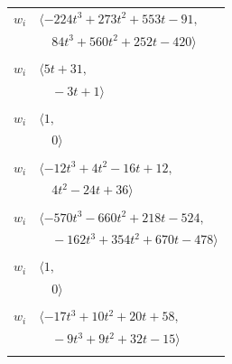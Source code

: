 \documentclass[11pt]{article}
\begin{document}
\begin{longtable}{@{}ll@{}}
$w_i$ & $\langle -224t^{3}+273t^{2}+553t-91,$\\
 & $\quad 84t^{3}+560t^{2}+252t-420\rangle$\\
\addlinespace[2pt]
\multicolumn{2}{@{}p{0.97\textwidth}@{}}{$i=79$, $D_i=1$, $\rho_{ij}$: $17{:}2, \allowbreak 61{:}1, \allowbreak 75{:}2, \allowbreak 77{:}2$}\\
$w_i$ & $\langle 5t+31,$\\
 & $\quad -3t+1\rangle$\\
\addlinespace[2pt]
\multicolumn{2}{@{}p{0.97\textwidth}@{}}{$i=80$, $D_i=1$, $\rho_{ij}$: $--$}\\
$w_i$ & $\langle 1,$\\
 & $\quad 0\rangle$\\
\addlinespace[2pt]
\multicolumn{2}{@{}p{0.97\textwidth}@{}}{$i=81$, $D_i=1$, $\rho_{ij}$: $3{:}2, \allowbreak 18{:}2, \allowbreak 36{:}2, \allowbreak 56{:}1, \allowbreak 60{:}2, \allowbreak 67{:}1, \allowbreak 84{:}1$}\\
$w_i$ & $\langle -12t^{3}+4t^{2}-16t+12,$\\
 & $\quad 4t^{2}-24t+36\rangle$\\
\addlinespace[2pt]
\multicolumn{2}{@{}p{0.97\textwidth}@{}}{$i=82$, $D_i=1$, $\rho_{ij}$: $0{:}1, \allowbreak 4{:}2, \allowbreak 19{:}1, \allowbreak 33{:}2, \allowbreak 50{:}1, \allowbreak 56{:}1, \allowbreak 60{:}1, \allowbreak 61{:}2, \allowbreak 63{:}1, \allowbreak 65{:}1, \allowbreak 67{:}1, \allowbreak 72{:}1, \allowbreak 78{:}1, \allowbreak 95{:}2$}\\
$w_i$ & $\langle -570t^{3}-660t^{2}+218t-524,$\\
 & $\quad -162t^{3}+354t^{2}+670t-478\rangle$\\
\addlinespace[2pt]
\multicolumn{2}{@{}p{0.97\textwidth}@{}}{$i=83$, $D_i=1$, $\rho_{ij}$: $--$}\\
$w_i$ & $\langle 1,$\\
 & $\quad 0\rangle$\\
\addlinespace[2pt]
\multicolumn{2}{@{}p{0.97\textwidth}@{}}{$i=84$, $D_i=1$, $\rho_{ij}$: $17{:}1, \allowbreak 19{:}2, \allowbreak 27{:}2, \allowbreak 34{:}1, \allowbreak 39{:}1, \allowbreak 60{:}1, \allowbreak 67{:}1, \allowbreak 70{:}1, \allowbreak 81{:}2$}\\
$w_i$ & $\langle -17t^{3}+10t^{2}+20t+58,$\\
 & $\quad -9t^{3}+9t^{2}+32t-15\rangle$\\
\addlinespace[2pt]
\multicolumn{2}{@{}p{0.97\textwidth}@{}}{$i=85$, $D_i=1$, $\rho_{ij}$: $--$}\\

\end{longtable}
\end{document}
